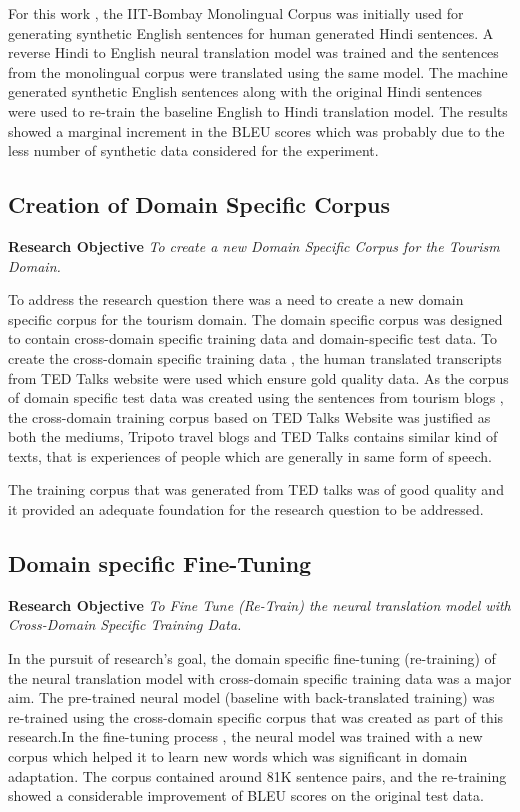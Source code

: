 For this work , the IIT-Bombay Monolingual Corpus was initially used for generating synthetic English sentences for human generated Hindi sentences. A reverse Hindi to English neural translation model was trained and the sentences from the monolingual corpus were translated using the same model. The machine generated synthetic English sentences along with the original Hindi sentences were used to re-train the baseline English to Hindi translation model. The results showed a marginal increment in the BLEU scores which was probably due to the less number of synthetic data considered for the experiment.

\subsection{Creation of Domain Specific Corpus}
\textbf{Research Objective} \textit{To create a new Domain Specific Corpus for the Tourism Domain.}

To address the research question there was a need to create a new domain specific corpus for the tourism domain. The domain specific corpus was designed to contain cross-domain specific training data and domain-specific test data. To create the cross-domain specific training data , the human translated transcripts from TED Talks website were used which ensure gold quality data. As the corpus of domain specific test data was created using the sentences from tourism blogs , the cross-domain training corpus based on TED Talks Website was justified as both the mediums, Tripoto travel blogs and TED Talks contains similar kind of texts, that is experiences of people which are generally in same form of speech. 

The training corpus that was generated from TED talks was of good quality and it provided an adequate foundation for the research question to be addressed.  

\subsection{Domain specific Fine-Tuning}
\textbf{Research Objective} \textit{To Fine Tune (Re-Train) the neural translation model with Cross-Domain Specific Training Data.
}

In the pursuit of research's goal, the domain specific fine-tuning (re-training) of the neural translation model with cross-domain specific training data was a major aim. The pre-trained neural model (baseline with back-translated training) was re-trained using the cross-domain specific corpus that was created as part of this research.In the fine-tuning process , the neural model was trained with a new corpus which helped it to learn new words which was significant in domain adaptation. The corpus contained around 81K sentence pairs, and the re-training showed a considerable improvement of BLEU scores on the original test data. 


